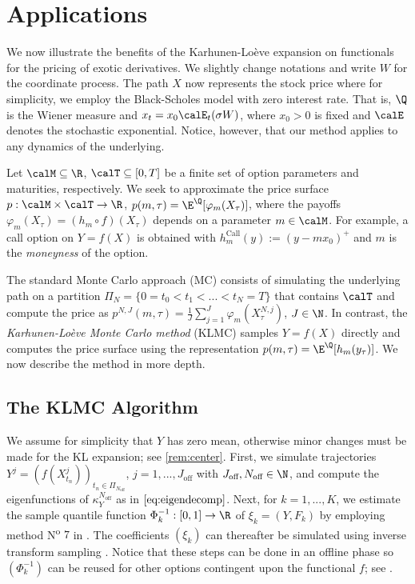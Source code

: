 \section{Applications} \label{sec:application}
We now illustrate the benefits of the Karhunen-Loève expansion on functionals for the pricing of exotic derivatives. %
We slightly change notations and write $W$ for the coordinate process. The path $X$ now represents the stock price where for simplicity, we employ the Black-Scholes model with zero interest rate. That is,  $\Q$ is the Wiener measure and $x_t = x_0 \calE_t(\sigma  W)$, where $x_0>0$ is fixed and  $\calE$ denotes the stochastic exponential.
Notice, however, that our method applies to any dynamics of the underlying.  

Let $\calM \subseteq \R$, $\calT \subseteq [0,T]$ be a finite set of option parameters and maturities, respectively. 
We seek to approximate the price surface
$p: \calM \times \calT \to \R$,  $p(m,\tau) = \E^{\Q}[ \varphi_m(X_\tau)]$, where the payoffs  $\varphi_m(X_{\tau}) = (h_m \circ  f)(X_{\tau})$ depends on a parameter $m \in \calM$.  For example, a call option on $Y=f(X)$  is obtained with $h^{\text{Call}}_m(y) := (y-m x_0)^{+}$ and $m$ is the \textit{moneyness} of the option.

The standard Monte Carlo  approach (MC) consists of simulating the underlying path  on a partition  $\Pi_{N} = \{0=t_0 < t_1 < ... < t_N=T \}$  that contains $\calT$ and compute the price as $p^{N,J}(m,\tau) = \frac{1}{J}\sum_{j=1}^J \varphi_m(X^{N,j}_\tau)$, $J\in \N$. 
In contrast, the \textit{Karhunen-Loève Monte Carlo method} (KLMC) samples $Y=f(X)$ directly and computes the price surface  using  the representation $p(m,\tau) = \E^{\Q}[ h_m(y_\tau)]$.  
We now describe the method in more depth. 
\subsection{The KLMC Algorithm}
We assume for simplicity that $Y$ has zero mean, otherwise minor changes  must be made for the KL expansion; see \cref{rem:center}. 
First, we simulate trajectories
$Y^j=(f(X_{t_n}^j))_{t_n \in \Pi_{N_{\text{off}}}}$, $j=1,...,J_{\text{off}}$ with  $J_{\text{off}}, N_{\text{off}} \in \N$,  and compute the eigenfunctions of $\kappa^{N_{\text{off}}}_Y$ as in  $\eqref{eq:eigendecomp}$. Next, for $k=1,...,K$,   we estimate the sample quantile function $\Phi_k^{-1}:[0,1]\to \R$ of $\xi_k = (Y,F_k)$ by employing method N\textsuperscript{o} $\! 7$ in \cite{HyndmanFan}.  
The coefficients $(\xi_k )$ can thereafter be simulated using inverse transform sampling \cite{Devroye}. 
  Notice that these steps can be done in an offline phase so $(\Phi_k^{-1})$ can be reused for other options contingent upon the functional $f$; see . 
  


